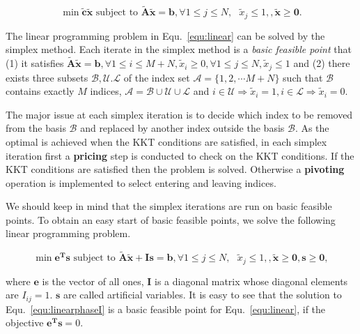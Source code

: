 \documentclass{llncs}
\begin{document}
\begin{equation}\label{equ:linear}
\min \tilde{\mathbf{c}}\tilde{\mathbf{x}}\textrm{ subject to } \tilde{\mathbf{A}}\tilde{\mathbf{x}} = \mathbf{b}, \forall 1\leq j\leq N,\textrm{ } \tilde{x}_j \leq 1, ,\tilde{\mathbf{x}}\geq \mathbf{0}.
\end{equation}

The linear programming problem in Equ.~\ref{equ:linear} can be solved by the simplex method. Each iterate in the simplex method is a \emph{basic feasible point} that (1) it satisfies $\tilde{\mathbf{A}}\tilde{\mathbf{x}} = \mathbf{b}, \forall 1\leq i\leq M+N,\tilde{x}_i \geq 0,\forall 1\leq j\leq N, \tilde{x}_j \leq 1$ and (2) there exists three subsets $\mathcal{B,U.L}$ of the index set $\mathcal{A}=\{1,2,\cdots M+N\}$ such that $\mathcal{B}$ contains exactly $M$ indices, $\mathcal{A}=\mathcal{B}\cup \mathcal{U} \cup \mathcal{L}$ and $i \in \mathcal{U} \Rightarrow \tilde{x}_i=1,i \in \mathcal{L} \Rightarrow \tilde{x}_i=0$.

The major issue at each simplex iteration is to decide which index to be removed from the basis $\mathcal{B}$ and replaced by another index outside the basis $\mathcal{B}$.  As the optimal is achieved when the KKT conditions are satisfied, in each simplex iteration first  a \textbf{pricing} step is conducted to check on the KKT conditions.  If the KKT conditions are satisfied then the problem is solved. Otherwise a \textbf{pivoting} operation is implemented to select entering and leaving indices.

We should keep in mind that the simplex iterations are run on basic feasible points. To obtain an easy start of basic feasible points, we solve the following linear programming problem.

\begin{equation}\label{equ:linearphaseI}
\min \mathbf{e^{T}s} \textrm{ subject to } \tilde{\mathbf{A}}\tilde{\mathbf{x}} + \mathbf{Is} = \mathbf{b},  \forall 1\leq j\leq N,\textrm{ } \tilde{x}_j \leq 1, ,\tilde{\mathbf{x}}\geq \mathbf{0}, \mathbf{s}\geq \mathbf{0},
\end{equation}

where $\mathbf{e}$ is the vector of all ones, $\mathbf{I}$ is a diagonal matrix whose diagonal elements are $I_{ij}=1$. $\mathbf{s}$ are called artificial variables. It is easy to see that the solution to Equ.~\ref{equ:linearphaseI} is a basic feasible point for Equ.~\ref{equ:linear}, if the objective $\mathbf{e^{T}s}=0 $.
\end{document}
